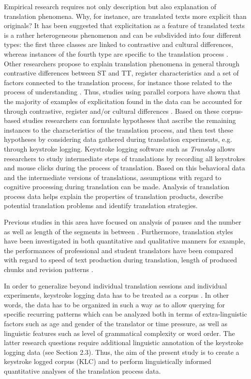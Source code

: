 \documentclass[output=paper]{LSP/langsci}
\begin{document}
Empirical research requires not only description but also explanation of translation phenomena. Why, for instance, are translated texts more explicit than originals? It has been suggested that explicitation as a feature of translated texts is a rather heterogeneous phenomenon and can be subdivided into four different types: the first three classes are linked to contrastive and cultural differences, whereas instances of the fourth type are specific to the translation process \citep[82-83]{Klaudy1998}. Other researchers propose to explain translation phenomena in general through contrastive differences between ST and TT, register characteristics and a set of factors connected to the translation process, for instance those related to the process of understanding \citep{Steiner2001}. Thus, studies using parallel corpora have shown that the majority of examples of explicitation found in the data can be accounted for through contrastive, register and/or cultural differences \citep{Hansen-Schirra2007,Becher2010}. Based on these corpus-based studies researchers can formulate hypotheses that ascribe the remaining instances to the characteristics of the translation process, and then test these hypotheses by considering data gathered during translation experiments, e.g. through keystroke logging. Keystroke logging software such as \textit{Translog} \citep{Jakobsen1999} allows researchers to study intermediate steps of translations by recording all keystrokes and mouse clicks during the process of translation. Based on this behavioral data and the intermediate versions of translations, assumptions with regard to cognitive processing during translation can be made. Analysis of translation process data helps explain the properties of translation products, describe potential translation problems and identify translation strategies.

Previous studies in this area have focused on analysis of pauses and the number as well as length of the segments in between \citep[e.g.][]{Dragsted2005,Jakobsen2005,Alves2009,Alves2011}. Furthermore, translation styles have been investigated in both quantitative and qualitative manners \citep[e.g.][]{Pagano2008, CarlandDragsted2011} for example, the performances of professional and student translators have been compared with regard to speed of text production during translation, length of produced chunks and revision patterns \citep[e.g.][]{Jakobsen2005}.
 
In order to generalize beyond individual translation sessions and individual experiments, keystroke logging data has to be treated as a corpus \citep{Alves2004, Alves2009, Alves2011}. In other words, the data has to be organized in such a way as to allow querying for specific recurring patterns \citep{Carl2009} which can be analyzed both in terms of extra-linguistic factors such as age and gender of the translator or time pressure, as well as linguistic features such as level of grammatical complexity or word order. The latter research questions require additional linguistic annotation of the keystroke logging data (see Section 2.3). Thus, the aim of the present study is to create a keystroke logged corpus (KLC) and to perform linguistically informed quantitative analyses of the translation process data.
\end{document}
